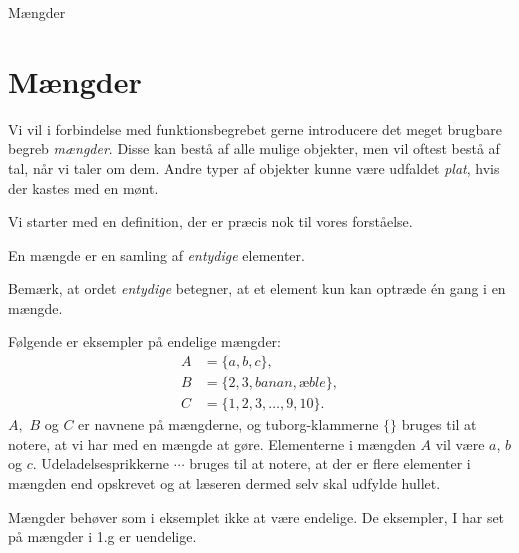 
\begin{center}
\Huge
Mængder
\end{center}

\section*{Mængder}
Vi vil i forbindelse med funktionsbegrebet gerne introducere det meget brugbare begreb \textit{mængder}. Disse kan bestå af alle mulige objekter, men vil oftest bestå af tal, når vi taler om dem. Andre typer af objekter kunne være udfaldet \textit{plat}, hvis der kastes med en mønt.  

Vi starter med en definition, der er præcis nok til vores forståelse.
\begin{defn}[Mængde]
En mængde er en samling af \textit{entydige} elementer. 
\end{defn}
Bemærk, at ordet \textit{entydige} betegner, at et element kun kan optræde én gang i en mængde. 
\begin{exa}
	Følgende er eksempler på endelige mængder:
	\begin{align*}
		A &= \{a,b,c\},\\
		B &= \{2,3,banan,æble\},\\
		C &= \{1,2,3,\hdots,9,10\}.
	\end{align*}
	$A,$ $B$ og $C$ er navnene på mængderne, og tuborg-klammerne $\{\}$ bruges til at notere, at vi har med en mængde at gøre. Elementerne i mængden $A$ vil være $a$, $b$ og
	$c$. Udeladelsesprikkerne $\cdots$ bruges til at notere, at der er flere elementer i mængden end opskrevet og at læseren dermed selv skal udfylde hullet. 
\end{exa}
Mængder behøver som i eksemplet ikke at være endelige. De eksempler, I har set på mængder i 1.g er uendelige.

